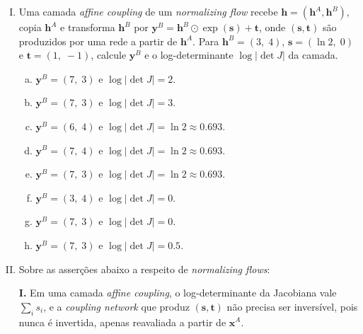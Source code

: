 \documentclass{dlproblemset}
\begin{document}
\begin{enumerate}[I)]
    \item Uma camada \textit{affine coupling} de um \textit{normalizing flow} recebe $\mathbf{h} = (\mathbf{h}^A, \mathbf{h}^B)$, copia $\mathbf{h}^A$ e transforma $\mathbf{h}^B$ por $\mathbf{y}^B = \mathbf{h}^B \odot \exp(\mathbf{s}) + \mathbf{t}$, onde $(\mathbf{s}, \mathbf{t})$ são produzidos por uma rede a partir de $\mathbf{h}^A$. Para $\mathbf{h}^B = (3,\; 4)$, $\mathbf{s} = (\ln 2,\; 0)$ e $\mathbf{t} = (1,\; -1)$, calcule $\mathbf{y}^B$ e o log-determinante $\log\lvert\det J\rvert$ da camada.
    \begin{enumerate}[(a)]
        \item $\mathbf{y}^B = (7,\; 3)$ \quad e \quad $\log\lvert\det J\rvert = 2$.
        \item $\mathbf{y}^B = (7,\; 3)$ \quad e \quad $\log\lvert\det J\rvert = 3$.
        \item $\mathbf{y}^B = (6,\; 4)$ \quad e \quad $\log\lvert\det J\rvert = \ln 2 \approx 0.693$.
        \item $\mathbf{y}^B = (7,\; 4)$ \quad e \quad $\log\lvert\det J\rvert = \ln 2 \approx 0.693$.
        \item $\mathbf{y}^B = (7,\; 3)$ \quad e \quad $\log\lvert\det J\rvert = \ln 2 \approx 0.693$.
        \item $\mathbf{y}^B = (3,\; 4)$ \quad e \quad $\log\lvert\det J\rvert = 0$.
        \item $\mathbf{y}^B = (7,\; 3)$ \quad e \quad $\log\lvert\det J\rvert = 0$.
        \item $\mathbf{y}^B = (7,\; 3)$ \quad e \quad $\log\lvert\det J\rvert = 0.5$.
    \end{enumerate}

    \item Sobre as asserções abaixo a respeito de \textit{normalizing flows}:

    \textbf{I.} Em uma camada \textit{affine coupling}, o log-determinante da Jacobiana vale $\sum_i s_i$, e a \textit{coupling network} que produz $(\mathbf{s}, \mathbf{t})$ não precisa ser inversível, pois nunca é invertida, apenas reavaliada a partir de $\mathbf{x}^{A}$.


\end{enumerate}
\end{document}
